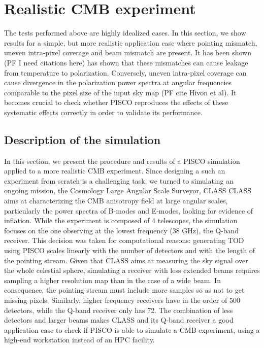 \documentclass[a4paper,11pt]{article}
\begin{document}
%
\section{Realistic CMB experiment}
\label{sec::realistic_cmb_experiment}

The tests performed above are highly idealized cases. In this section, we show results for a simple, but more realistic application case where pointing mismatch, uneven intra-pixel coverage and beam mismatch are present. It has been shown (PF I need citations here) has shown that these mismatches can cause leakage from temperature to polarization. Conversely, uneven intra-pixel coverage can cause divergence in the polarization power spectra at angular frequencies comparable to the pixel size of the input sky map (PF cite Hivon et al). It becomes crucial to check whether PISCO reproduces the effects of these systematic effects correctly in order to validate its performance.
 
\subsection{Description of the simulation}

In this section, we present the procedure and results of a PISCO simulation applied to a more realistic CMB experiment. Since designing a such an experiment from scratch is a challenging task, we turned to simulating an ongoing mission, the Cosmology Large Angular Scale Surveyor, CLASS\cite{2016SPIE.9914E..1KH} CLASS aims at characterizing the CMB anisotropy field at large angular scales, particularly the power spectra of B-modes and E-modes, looking for evidence of inflation. While the experiment is composed of 4 telescopes, the simulation focuses on the one observing at the lowest frequency (38 GHz), the Q-band receiver. This decision was taken for computational reasons: generating TOD using PISCO scales linearly with the number of detectors and with the length of the pointing stream. Given that CLASS aims at measuring the sky signal over the whole celestial sphere, simulating a receiver with less extended beams requires sampling a higher resolution map than in the case of a wide beam. In consequence, the pointing stream must include more samples so as not to get missing pixels. Similarly, higher frequency receivers have in the order of 500 detectors, while the Q-band receiver only has 72. The combination of less detectors and larger beams makes CLASS and its Q-band receiver a good application case to check if PISCO is able to simulate a CMB experiment, using a high-end workstation instead of an HPC facility.
\end{document}
